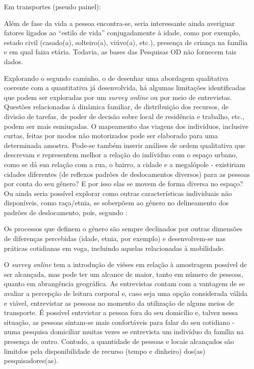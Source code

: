 Em transportes (pseudo painel): \cite{DARGAY1999,DARGAY2002,BRESSON2004}

Além de fase da vida a pessoa encontra-se, seria interessante ainda averiguar fatores ligados ao ``estilo de vida'' conjugadamente à idade, como por exemplo, estado civil (casado(a), solteiro(a), viúvo(a), etc.), presença de criança na família e em qual faiza etária. Todavia, as bases das Pesquisas OD não fornecem tais dados.



Explorando o segundo caminho, o de desenhar uma abordagem qualitativa coerente com a quantitativa já desenvolvida, há algumas limitações identificadas que podem ser exploradas por um \emph{survey online} ou por meio de entrevistas. Questões relacionadas à dinâmica familiar, de distribuição dos recursos, de divisão de tarefas, de poder de decisão sobre local de residência e trabalho, etc., podem ser mais esmiuçadas. O mapeamento das viagens dos indivíduos, inclusive curtas, feitas por modos não motorizados pode ser elaborado para uma determinada amostra. Pode-se também inserir análises de ordem qualitativa que descrevam e representem melhor a relação do indíviduo com o espaço urbano, como se dá sua relação com a rua, o bairro, a cidade e a megalópole - existiriam cidades diferentes (de reflexos padrões de deslocamentos diversos) para as pessoas por conta do seu gênero? E por isso elas se movem de forma diversa no espaço? Ou ainda seria possível explorar como outras características individuais não disponíveis, como raça/etnia, se soberpõem ao gênero no delineamento dos padrões de deslocamento, pois, segundo :

\begin{citacao}
Os processos que definem o gênero são sempre declinados  por outras dimensões de diferenças percebidas (idade, etnia, por exemplo) e desenvolvem-se nas práticas cotidianas em voga, incluindo aquelas relacionadas à mobilidade.
\end{citacao}

O \emph{survey online} tem a introdução de viéses em relação à amostragem possível de ser alcançada, mas pode ter um alcance de maior, tanto em número de pessoas, quanto em abrangência geográfica. 
As entrevistas contam com a vantagem de se avaliar a percepção de leitura corporal e, caso seja uma opção considerada válida e viável, entrevistar as pessoas no momento da utilização de alguns meios de transporte. 
É possível entrvistar a pessoa fora do seu domicílio e, talvez nessa situação, as pessoas sintam-se mais confortáveis para falar do seu cotidiano - numa pesquisa domiciliar muitas vezes se entrevista um indivíduo da família na presença de outro. Contudo, a quantidade de pessoas e locais alcançados são limitdos pela disponibilidade de recurso (tempo e dinheiro) dos(as) pesquisadores(as). 

